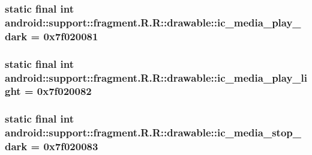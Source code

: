 \hypertarget{classandroid_1_1support_1_1fragment_1_1_r_1_1drawable_d26a137c2ba840290f8046725924a47e}{
\subsubsection[{ic\_\-media\_\-play\_\-dark}]{\setlength{\rightskip}{0pt plus 5cm}static final int android::support::fragment.R.R::drawable::ic\_\-media\_\-play\_\-dark = 0x7f020081}}
\label{classandroid_1_1support_1_1fragment_1_1_r_1_1drawable_d26a137c2ba840290f8046725924a47e}


\hypertarget{classandroid_1_1support_1_1fragment_1_1_r_1_1drawable_294b6578ca0bdbdf8cd77052798271b9}{
\subsubsection[{ic\_\-media\_\-play\_\-light}]{\setlength{\rightskip}{0pt plus 5cm}static final int android::support::fragment.R.R::drawable::ic\_\-media\_\-play\_\-light = 0x7f020082}}
\label{classandroid_1_1support_1_1fragment_1_1_r_1_1drawable_294b6578ca0bdbdf8cd77052798271b9}


\hypertarget{classandroid_1_1support_1_1fragment_1_1_r_1_1drawable_80f502f088971037a854f0da577d2af4}{
\subsubsection[{ic\_\-media\_\-stop\_\-dark}]{\setlength{\rightskip}{0pt plus 5cm}static final int android::support::fragment.R.R::drawable::ic\_\-media\_\-stop\_\-dark = 0x7f020083}}
\label{classandroid_1_1support_1_1fragment_1_1_r_1_1drawable_80f502f088971037a854f0da577d2af4}


